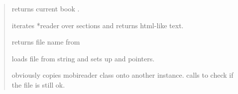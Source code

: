 \documentclass[letterpaper,10pt,english]{sphinxmanual}
\begin{document}
\begin{quote}

\begin{fulllineitems}
\label{mobireader:mobireader::get_titleC}
returns current book {\hyperref[mobireader:mobireader::title__cP]{}}.

\end{fulllineitems}


\begin{fulllineitems}
\label{mobireader:mobireader::get_htmlC}
iterates *reader over sections and returns html-like text.

\end{fulllineitems}


\begin{fulllineitems}
\label{mobireader:mobireader::get_file_nameC}
returns file name from {\hyperref[mobireader:mobireader::input_file_name__string]{}}

\end{fulllineitems}


\begin{fulllineitems}
\label{mobireader:mobireader::load_file__ssR}
loads file from string and sets up {\hyperref[mobireader:mobireader::handler__header_handlerP]{}} and {\hyperref[mobireader:mobireader::file__ifstreamP]{}} pointers.

\end{fulllineitems}


\begin{fulllineitems}
\label{mobireader:mobireader::assign-operator__mobireaderCR}
obviously copies mobireader class onto another instance.
calls {\hyperref[mobireader:mobireader::load_file__ssR]{}} to check if the file is still ok.

\end{fulllineitems}

\end{quote}
\end{document}

